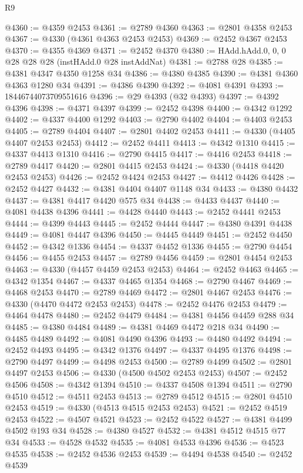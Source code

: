 \begin{lexlean}{R9}
\begin{coremodule}
@4360 := @4359 @2453
@4361 := @2789 @4360
@4363 := @2801 @4358 @2453
@4367 := @4330 (@4361 @4363 @2453 @2453)
@4369 := @2452 @4367 @2453
@4370 := @4355 @4369
@4371 := @2452 @4370
@4380 := HAdd.hAdd.{0, 0, 0} @28 @28 @28 (instHAdd.{0} @28 instAddNat)
@4381 := @2788 @28
@4385 := @4381 @4347 @4350 @1258 @34
@4386 := @4380 @4385
@4390 := @4381 @4360 @4363 @1280 @34
@4391 := @4386 @4390
@4392 := @4081 @4391
@4393 := 18446744073709551616
@4396 := @29 @4393 (@32 @4393)
@4397 := @4392 @4396
@4398 := @4371 @4397
@4399 := @2452 @4398
@4400 := @4342 @1292
@4402 := @4337 @4400 @1292
@4403 := @2790 @4402
@4404 := @4403 @2453
@4405 := @2789 @4404
@4407 := @2801 @4402 @2453
@4411 := @4330 (@4405 @4407 @2453 @2453)
@4412 := @2452 @4411
@4413 := @4342 @1310
@4415 := @4337 @4413 @1310
@4416 := @2790 @4415
@4417 := @4416 @2453
@4418 := @2789 @4417
@4420 := @2801 @4415 @2453
@4424 := @4330 (@4418 @4420 @2453 @2453)
@4426 := @2452 @4424 @2453
@4427 := @4412 @4426
@4428 := @2452 @4427
@4432 := @4381 @4404 @4407 @1148 @34
@4433 := @4380 @4432
@4437 := @4381 @4417 @4420 @575 @34
@4438 := @4433 @4437
@4440 := @4081 @4438 @4396
@4441 := @4428 @4440
@4443 := @2452 @4441 @2453
@4444 := @4399 @4443
@4445 := @2452 @4444
@4447 := @4380 @4391 @4438
@4449 := @4081 @4447 @4396
@4450 := @4445 @4449
@4451 := @2452 @4450
@4452 := @4342 @1336
@4454 := @4337 @4452 @1336
@4455 := @2790 @4454
@4456 := @4455 @2453
@4457 := @2789 @4456
@4459 := @2801 @4454 @2453
@4463 := @4330 (@4457 @4459 @2453 @2453)
@4464 := @2452 @4463
@4465 := @4342 @1354
@4467 := @4337 @4465 @1354
@4468 := @2790 @4467
@4469 := @4468 @2453
@4470 := @2789 @4469
@4472 := @2801 @4467 @2453
@4476 := @4330 (@4470 @4472 @2453 @2453)
@4478 := @2452 @4476 @2453
@4479 := @4464 @4478
@4480 := @2452 @4479
@4484 := @4381 @4456 @4459 @288 @34
@4485 := @4380 @4484
@4489 := @4381 @4469 @4472 @218 @34
@4490 := @4485 @4489
@4492 := @4081 @4490 @4396
@4493 := @4480 @4492
@4494 := @2452 @4493
@4495 := @4342 @1376
@4497 := @4337 @4495 @1376
@4498 := @2790 @4497
@4499 := @4498 @2453
@4500 := @2789 @4499
@4502 := @2801 @4497 @2453
@4506 := @4330 (@4500 @4502 @2453 @2453)
@4507 := @2452 @4506
@4508 := @4342 @1394
@4510 := @4337 @4508 @1394
@4511 := @2790 @4510
@4512 := @4511 @2453
@4513 := @2789 @4512
@4515 := @2801 @4510 @2453
@4519 := @4330 (@4513 @4515 @2453 @2453)
@4521 := @2452 @4519 @2453
@4522 := @4507 @4521
@4523 := @2452 @4522
@4527 := @4381 @4499 @4502 @193 @34
@4528 := @4380 @4527
@4532 := @4381 @4512 @4515 @77 @34
@4533 := @4528 @4532
@4535 := @4081 @4533 @4396
@4536 := @4523 @4535
@4538 := @2452 @4536 @2453
@4539 := @4494 @4538
@4540 := @2452 @4539

\end{coremodule}
\end{lexlean}
